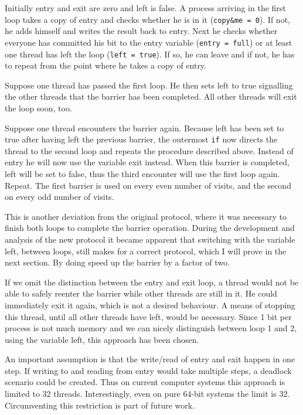 \documentclass[a4paper, 10pt]{article}
\begin{document}
Initially entry and exit are zero and left is false. A process arriving in the first loop takes a copy of entry and checks whether he is in it (\texttt{copy\&me = 0}). If not, he adds himself and writes the result back to entry. Next he checks whether everyone has committed his bit to the entry variable (\texttt{entry = full}) or at least one thread has left the loop (\texttt{left = true}). If so, he can leave and if not, he has to repeat from the point where he takes a copy of entry.

Suppose one thread has passed the first loop. He then sets left to true signalling the other threads that the barrier has been completed. All other threads will exit the loop soon, too.

Suppose one thread encounters the barrier again. Because left has been set to true after having left the previous barrier, the outermost \texttt{if} now directs the thread to the second loop and repeats the procedure described above. Instead of entry he will now use the variable exit instead. When this barrier is completed, left will be set to false, thus the third encounter will use the first loop again. Repeat. The first barrier is used on every even number of visits, and the second on every odd number of visits.

This is another deviation from the original protocol, where it was necessary to finish both loops to complete the barrier operation. During the development and analysis of the new protocol it became apparent that switching with the variable left, between loops, still makes for a correct protocol, which I will prove in the next section. By doing speed up the barrier by a factor of two.

If we omit the distinction between the entry and exit loop, a thread would not be able to safely reenter the barrier while other threads are still in it. He could immediately exit it again, which is not a desired behaviour. A means of stopping this thread, until all other threads have left, would be necessary. Since 1 bit per process is not much memory and we can nicely distinguish between loop 1 and 2, using the variable left, this approach has been chosen.

An important assumption is that the write/read of entry and exit happen in one step. If writing to and reading from entry would take multiple steps, a deadlock scenario could be created. Thus on current computer systems this approach is limited to 32 threads. Interestingly, even on pure 64-bit systems the limit is 32. Circumventing this restriction is part of future work.
\end{document}
